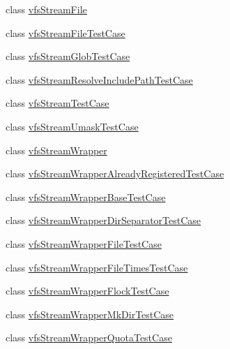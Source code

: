 \begin{DoxyCompactItemize}
\item 
class \mbox{\hyperlink{classorg_1_1bovigo_1_1vfs_1_1vfs_stream_file}{vfs\+Stream\+File}}
\item 
class \mbox{\hyperlink{classorg_1_1bovigo_1_1vfs_1_1vfs_stream_file_test_case}{vfs\+Stream\+File\+Test\+Case}}
\item 
class \mbox{\hyperlink{classorg_1_1bovigo_1_1vfs_1_1vfs_stream_glob_test_case}{vfs\+Stream\+Glob\+Test\+Case}}
\item 
class \mbox{\hyperlink{classorg_1_1bovigo_1_1vfs_1_1vfs_stream_resolve_include_path_test_case}{vfs\+Stream\+Resolve\+Include\+Path\+Test\+Case}}
\item 
class \mbox{\hyperlink{classorg_1_1bovigo_1_1vfs_1_1vfs_stream_test_case}{vfs\+Stream\+Test\+Case}}
\item 
class \mbox{\hyperlink{classorg_1_1bovigo_1_1vfs_1_1vfs_stream_umask_test_case}{vfs\+Stream\+Umask\+Test\+Case}}
\item 
class \mbox{\hyperlink{classorg_1_1bovigo_1_1vfs_1_1vfs_stream_wrapper}{vfs\+Stream\+Wrapper}}
\item 
class \mbox{\hyperlink{classorg_1_1bovigo_1_1vfs_1_1vfs_stream_wrapper_already_registered_test_case}{vfs\+Stream\+Wrapper\+Already\+Registered\+Test\+Case}}
\item 
class \mbox{\hyperlink{classorg_1_1bovigo_1_1vfs_1_1vfs_stream_wrapper_base_test_case}{vfs\+Stream\+Wrapper\+Base\+Test\+Case}}
\item 
class \mbox{\hyperlink{classorg_1_1bovigo_1_1vfs_1_1vfs_stream_wrapper_dir_separator_test_case}{vfs\+Stream\+Wrapper\+Dir\+Separator\+Test\+Case}}
\item 
class \mbox{\hyperlink{classorg_1_1bovigo_1_1vfs_1_1vfs_stream_wrapper_file_test_case}{vfs\+Stream\+Wrapper\+File\+Test\+Case}}
\item 
class \mbox{\hyperlink{classorg_1_1bovigo_1_1vfs_1_1vfs_stream_wrapper_file_times_test_case}{vfs\+Stream\+Wrapper\+File\+Times\+Test\+Case}}
\item 
class \mbox{\hyperlink{classorg_1_1bovigo_1_1vfs_1_1vfs_stream_wrapper_flock_test_case}{vfs\+Stream\+Wrapper\+Flock\+Test\+Case}}
\item 
class \mbox{\hyperlink{classorg_1_1bovigo_1_1vfs_1_1vfs_stream_wrapper_mk_dir_test_case}{vfs\+Stream\+Wrapper\+Mk\+Dir\+Test\+Case}}
\item 
class \mbox{\hyperlink{classorg_1_1bovigo_1_1vfs_1_1vfs_stream_wrapper_quota_test_case}{vfs\+Stream\+Wrapper\+Quota\+Test\+Case}}
\item 

\end{DoxyCompactItemize}
